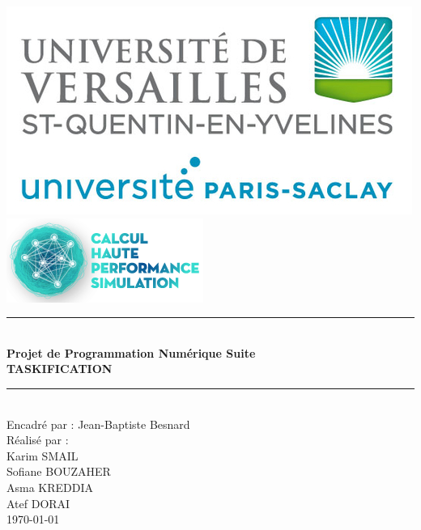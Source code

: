 \documentclass[12pt,titlepage]{article}
\begin{document}

\begin{titlepage}
\newcommand{\HRule}{\rule{\linewidth}{0.1mm}}
\center

\includegraphics[scale=0.4]{logo.png} \\[0.2cm]
\includegraphics[scale=0.7]{CHPS_logo.png} \\[0.2cm]

\HRule \\[0.4cm]
{ \huge \bfseries Projet de Programmation Numérique Suite\\ TASKIFICATION
  \\[0.15cm] }
\HRule \\[1.5cm]
Encadré par : Jean-Baptiste Besnard
\\Réalisé par : \\ Karim SMAIL\\ Sofiane BOUZAHER  \\ Asma  KREDDIA\\ Atef DORAI 
\\[1cm]
\today \\ [1cm]
\end{titlepage}

\end{document}
